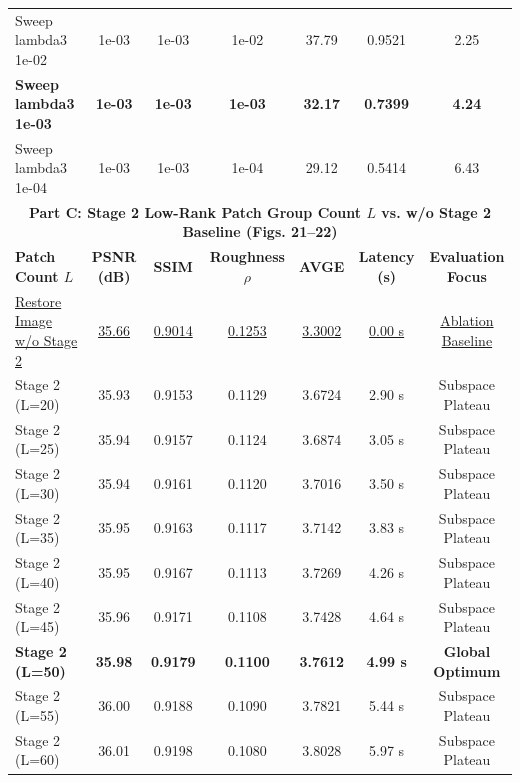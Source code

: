 \begin{table}[t]
{\begin{tabular}{lcccccc}
Sweep lambda3 1e-02 & 1e-03 & 1e-03 & 1e-02 & 37.79 & 0.9521 & 2.25 \\
\textbf{Sweep lambda3 1e-03} & \textbf{1e-03} & \textbf{1e-03} & \textbf{1e-03} & \textbf{32.17} & \textbf{0.7399} & \textbf{4.24} \\
Sweep lambda3 1e-04 & 1e-03 & 1e-03 & 1e-04 & 29.12 & 0.5414 & 6.43 \\
\midrule
\multicolumn{7}{c}{\textbf{Part C: Stage 2 Low-Rank Patch Group Count $L$ vs. w/o Stage 2 Baseline (Figs. 21--22)}} \\
\midrule
\textbf{Patch Count $L$} & \textbf{PSNR (dB)} & \textbf{SSIM} & \textbf{Roughness $\rho$} & \textbf{AVGE} & \textbf{Latency (s)} & \textbf{Evaluation Focus} \\
\midrule
\underline{Restore Image w/o Stage 2} & \underline{35.66} & \underline{0.9014} & \underline{0.1253} & \underline{3.3002} & \underline{0.00 s} & \underline{Ablation Baseline} \\
Stage 2 (L=20) & 35.93 & 0.9153 & 0.1129 & 3.6724 & 2.90 s & Subspace Plateau \\
Stage 2 (L=25) & 35.94 & 0.9157 & 0.1124 & 3.6874 & 3.05 s & Subspace Plateau \\
Stage 2 (L=30) & 35.94 & 0.9161 & 0.1120 & 3.7016 & 3.50 s & Subspace Plateau \\
Stage 2 (L=35) & 35.95 & 0.9163 & 0.1117 & 3.7142 & 3.83 s & Subspace Plateau \\
Stage 2 (L=40) & 35.95 & 0.9167 & 0.1113 & 3.7269 & 4.26 s & Subspace Plateau \\
Stage 2 (L=45) & 35.96 & 0.9171 & 0.1108 & 3.7428 & 4.64 s & Subspace Plateau \\
\textbf{Stage 2 (L=50)} & \textbf{35.98} & \textbf{0.9179} & \textbf{0.1100} & \textbf{3.7612} & \textbf{4.99 s} & \textbf{Global Optimum} \\
Stage 2 (L=55) & 36.00 & 0.9188 & 0.1090 & 3.7821 & 5.44 s & Subspace Plateau \\
Stage 2 (L=60) & 36.01 & 0.9198 & 0.1080 & 3.8028 & 5.97 s & Subspace Plateau \\
\bottomrule
\end{tabular}
}
\end{table}